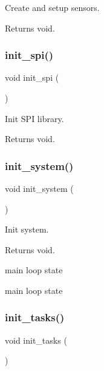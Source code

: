 Create and setup sensors. 

\begin{DoxyReturn}{Returns}
void. 
\end{DoxyReturn}
\mbox{\label{i2c-th_8h_a4454f968b2402a0e61deb15ab2571dab}} 
\subsubsection{\texorpdfstring{init\+\_\+spi()}{init\_spi()}}
{\footnotesize\ttfamily void init\+\_\+spi (\begin{DoxyParamCaption}{ }\end{DoxyParamCaption})}



Init S\+PI library. 

\begin{DoxyReturn}{Returns}
void. 
\end{DoxyReturn}
\mbox{\label{i2c-th_8h_a348d23d5899ce59d18975284dfb0afc0}} 
\subsubsection{\texorpdfstring{init\+\_\+system()}{init\_system()}}
{\footnotesize\ttfamily void init\+\_\+system (\begin{DoxyParamCaption}{ }\end{DoxyParamCaption})}



Init system. 

\begin{DoxyReturn}{Returns}
void. 
\end{DoxyReturn}
main loop state

main loop state \mbox{\label{i2c-th_8h_a2aae2290a141fddcea3fb6009acbb445}} 
\subsubsection{\texorpdfstring{init\+\_\+tasks()}{init\_tasks()}}
{\footnotesize\ttfamily void init\+\_\+tasks (\begin{DoxyParamCaption}{ }\end{DoxyParamCaption})}



